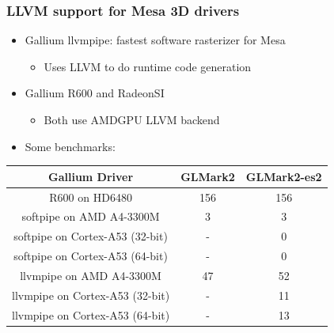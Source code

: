 \documentclass{beamer}
\begin{document}
\begin{frame}
\frametitle{LLVM support for Mesa 3D drivers}
\begin{itemize}
  \item Gallium llvmpipe: fastest software rasterizer for Mesa
  \begin{itemize}
    \item Uses LLVM to do runtime code generation
  \end{itemize}
  \item Gallium R600 and RadeonSI
  \begin{itemize}
    \item Both use AMDGPU LLVM backend
  \end{itemize}
    \item Some benchmarks:
\end{itemize}
\centering
  \begin{tabular}{c|c|c}
  \textbf{Gallium Driver} & \textbf{GLMark2} & \textbf{GLMark2-es2} \\
  \hline
  R600 on HD6480 & 156 & 156 \\
  softpipe on AMD A4-3300M & 3 & 3 \\
  softpipe on Cortex-A53 (32-bit) & - & 0 \\
  softpipe on Cortex-A53 (64-bit) & - & 0 \\
  llvmpipe on AMD A4-3300M & 47 & 52 \\
  llvmpipe on Cortex-A53 (32-bit) & - & 11 \\
  llvmpipe on Cortex-A53 (64-bit) & - & 13 \\
  \end{tabular}
\end{frame}

\end{document}
